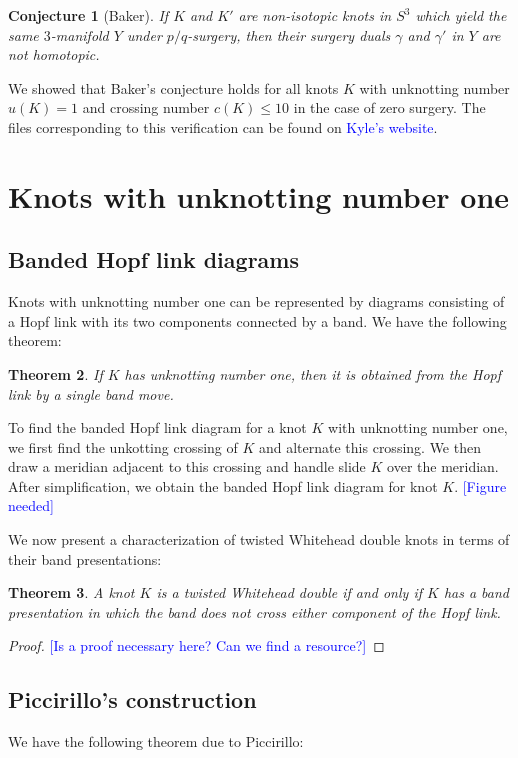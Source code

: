\documentclass[11pt,usenames,dvipsnames,reqno]{amsart}
\newtheorem{theorem}{Theorem}
\numberwithin{theorem}{section}
\newtheorem{conjecture}[theorem]{Conjecture}
\theoremstyle{ex}
\theoremstyle{rem}
\def\kh#1{\textcolor{Blue}{#1}}
\begin{document}
\begin{conjecture}[Baker] If $K$ and $K'$ are non-isotopic knots in $S^3$ which yield the same $3$-manifold $Y$ under $p/q$-surgery, then their surgery duals $\gamma$ and $\gamma'$ in $Y$ are not homotopic.
\end{conjecture}

We showed that Baker's conjecture holds for all knots $K$ with unknotting number $u(K) = 1$ and crossing number $c(K) \leq 10$ in the case of zero surgery. The files corresponding to this verification can be found on \kh{Kyle's website}.


\section{Knots with unknotting number one}\label{sec:unknotting-one}


\subsection{Banded Hopf link diagrams} Knots with unknotting number one can be represented by diagrams consisting of a Hopf link with its two components connected by a band. We have the following theorem:

\begin {theorem} If $K$ has unknotting number one, then it is obtained from the Hopf link by a single band move.
\end{theorem}

To find the banded Hopf link diagram for a knot $K$ with unknotting number one, we first find the unkotting crossing of $K$ and alternate this crossing. We then draw a meridian adjacent to this crossing and handle slide $K$ over the meridian. After simplification, we obtain the banded Hopf link diagram for knot $K$. \kh{[Figure needed]}

We now present a characterization of twisted Whitehead double knots in terms of their band presentations:

\begin{theorem}\label{thm:twd} A knot $K$ is a twisted Whitehead double if and only if $K$ has a band presentation in which the band does not cross either component of the Hopf link.
\end{theorem}
\begin{proof}
	\kh{[Is a proof necessary here? Can we find a resource?]}
\end{proof}

\subsection{Piccirillo's construction} We have the following theorem due to Piccirillo:
\end{document}
